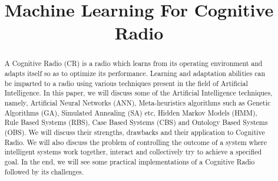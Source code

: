 \documentclass[conference]{IEEEtran}
\begin{document}
\title{Machine Learning For Cognitive Radio}

\author{
}

\maketitle

\begin{abstract}
A Cognitive Radio (CR) is a radio which learns from its operating environment and adapts itself so as to optimize its performance. Learning and adaptation abilities can be imparted to a radio using various techniques present in the field of Artificial Intelligence. In this paper, we will discuss some of the Artificial Intelligence techniques, namely, Artificial Neural Networks (ANN), Meta-heuristics algorithms such as Genetic Algorithms (GA), Simulated Annealing (SA) etc, Hidden Markov Models (HMM), Rule Based Systems (RBS), Case Based Systems (CBS) and Ontology Based Systems (OBS). We will discuss their strengths, drawbacks and their application to Cognitive Radio. We will also discuss the problem of controlling the outcome of a system where intelligent systems work together, interact and collectively try to achieve a specified goal. In the end, we will see some practical implementations of a Cognitive Radio followed by its challenges.
\end{abstract}

%
\IEEEpeerreviewmaketitle
\end{document}
